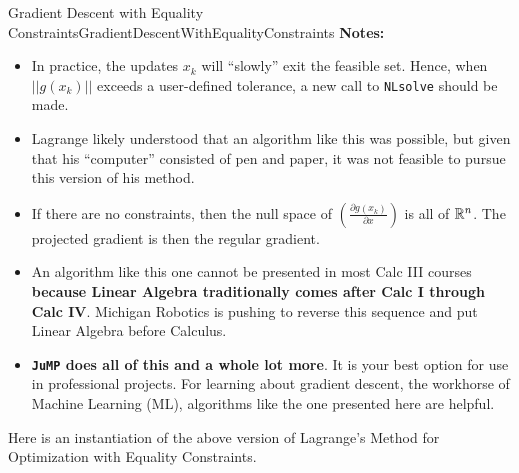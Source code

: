 \begin{methodColor}{Gradient Descent with Equality Constraints}{GradientDescentWithEqualityConstraints}
\textbf{Notes:} 
\begin{itemize}
    \item In practice, the updates $x_k$ will ``slowly'' exit the feasible set. Hence, when $||g(x_k)||$ exceeds a user-defined tolerance, a new call to \texttt{NLsolve} should be made. 
    \item Lagrange likely understood that an algorithm like this was possible, but given that his ``computer'' consisted of pen and paper, it was not feasible to pursue this version of his method.
    \item If there are no constraints, then the null space of $\left( \frac{\partial g(x_k)}{\partial x} \right)$ is all of $\mathbb R^n$. The projected gradient is then the regular gradient. 
    \item An algorithm like this one cannot be presented in most Calc III courses  \textbf{because Linear Algebra traditionally comes after Calc I through Calc IV}. Michigan Robotics is pushing to reverse this sequence and put Linear Algebra before Calculus. 
    \item \textbf{\texttt{JuMP} does all of this and a whole lot more}. It is your best option for use in professional projects. For learning about gradient descent, the workhorse of Machine Learning (ML), algorithms like the one presented here are helpful.
\end{itemize}   
\end{methodColor}

Here is an instantiation of the above version of Lagrange's Method for Optimization with Equality Constraints. 

